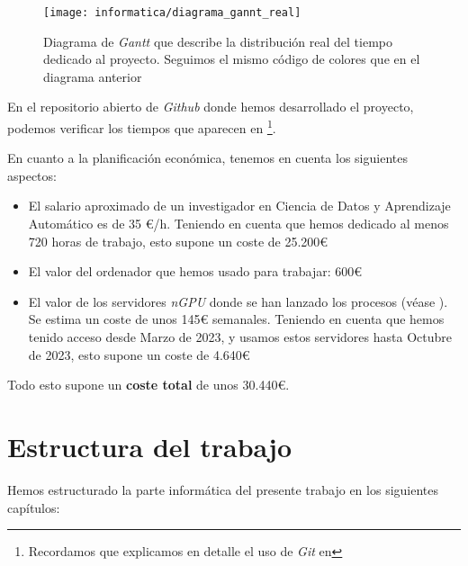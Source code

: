 \begin{figure}[H]
	\centering
	\texttt{[image: informatica/diagrama\_gannt\_real]}
	\caption{Diagrama de \textit{Gantt} que describe la distribución real del tiempo dedicado al proyecto. Seguimos el mismo código de colores que en el diagrama anterior}
	\label{img:gannt_real}
\end{figure}

En el repositorio abierto de \textit{Github} \cite{informatica:repogithub} donde hemos desarrollado el proyecto, podemos verificar los tiempos que aparecen en  \footnote{Recordamos que explicamos en detalle el uso de \textit{Git} en }.

En cuanto a la planificación económica, tenemos en cuenta los siguientes aspectos:

\begin{itemize}
	\item El salario aproximado de un investigador en Ciencia de Datos y Aprendizaje Automático es de 35 €/h. Teniendo en cuenta que hemos dedicado al menos 720 horas de trabajo, esto supone un coste de 25.200€
	\item El valor del ordenador que hemos usado para trabajar: 600€
	\item El valor de los servidores \textit{nGPU} donde se han lanzado los procesos (véase ). Se estima un coste de unos 145€ semanales. Teniendo en cuenta que hemos tenido acceso desde Marzo de 2023, y usamos estos servidores hasta Octubre de 2023, esto supone un coste de 4.640€
\end{itemize}

Todo esto supone un \textbf{coste total} de unos 30.440€.

\section{Estructura del trabajo}

Hemos estructurado la parte informática del presente trabajo en los siguientes capítulos:

